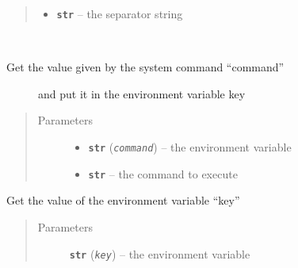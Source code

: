 \documentclass[a4paper,10pt,english]{sphinxmanual}
\begin{document}
\begin{fulllineitems}
\begin{fulllineitems}
\begin{quote}
\begin{description}
\begin{itemize}
\item {} 
\textbf{\texttt{str}} -- the separator string

\end{itemize}

\end{description}\end{quote}

\end{fulllineitems}


\begin{fulllineitems}
\label{commands/apidoc/src:src.environment.Environ.command_value}~\begin{description}
\item[{Get the value given by the system command ``command'' }] \leavevmode
and put it in the environment variable key

\end{description}
\begin{quote}\begin{description}
\item[{Parameters}] \leavevmode\begin{itemize}
\item {} 
\textbf{\texttt{str}} (\emph{\texttt{command}}) -- the environment variable

\item {} 
\textbf{\texttt{str}} -- the command to execute

\end{itemize}

\end{description}\end{quote}

\end{fulllineitems}


\begin{fulllineitems}
\label{commands/apidoc/src:src.environment.Environ.get}
Get the value of the environment variable ``key''
\begin{quote}\begin{description}
\item[{Parameters}] \leavevmode
\textbf{\texttt{str}} (\emph{\texttt{key}}) -- the environment variable


\end{description}
\end{quote}
\end{fulllineitems}
\end{fulllineitems}
\end{document}
